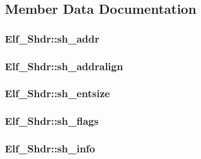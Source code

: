 \subsection{Member Data Documentation}
\hypertarget{struct_elf___shdr_a826352a4993890b47567434a06f16c76}{
\subsubsection[{sh\+\_\+addr}]{ Elf\+\_\+\+Shdr\+::sh\+\_\+addr}}\label{struct_elf___shdr_a826352a4993890b47567434a06f16c76}
\hypertarget{struct_elf___shdr_a7bb165f0fd6c081eada5e98d8035035b}{
\subsubsection[{sh\+\_\+addralign}]{ Elf\+\_\+\+Shdr\+::sh\+\_\+addralign}}\label{struct_elf___shdr_a7bb165f0fd6c081eada5e98d8035035b}
\hypertarget{struct_elf___shdr_ad272d1a6e6c10a6c42413dd2d81f21fd}{
\subsubsection[{sh\+\_\+entsize}]{ Elf\+\_\+\+Shdr\+::sh\+\_\+entsize}}\label{struct_elf___shdr_ad272d1a6e6c10a6c42413dd2d81f21fd}
\hypertarget{struct_elf___shdr_a9918ef6292b347509932bc834811c6dc}{
\subsubsection[{sh\+\_\+flags}]{ Elf\+\_\+\+Shdr\+::sh\+\_\+flags}}\label{struct_elf___shdr_a9918ef6292b347509932bc834811c6dc}
\hypertarget{struct_elf___shdr_a3714dde78b35f48bfb51595683a61173}{
\subsubsection[{sh\+\_\+info}]{ Elf\+\_\+\+Shdr\+::sh\+\_\+info}}\label{struct_elf___shdr_a3714dde78b35f48bfb51595683a61173}
